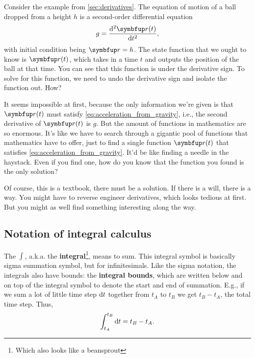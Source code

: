 Consider the example from \cref{sec:derivatives}. The equation of motion of a ball dropped from a height \(h\) is a second-order differential equation
\begin{equation}
  g = \odv[ord = 2]{\vv{r}(t)}{t}, \label{eq:acceleration_from_gravity}
\end{equation}
with initial condition being \(\vv{r} = h\). The state function that we ought to know is \(\vv{r}(t)\), which takes in a time \(t\) and outputs the position of the ball at that time. You can see that this function is under the derivative sign. To solve for this function, we need to undo the derivative sign and isolate the function out. How?

It seems impossible at first, because the only information we're given is that \(\vv{r}(t)\) must satisfy \cref{eq:acceleration_from_gravity}, i.e., the second derivative of \(\vv{r}(t)\) is \(g\). But the amount of functions in mathematics are so enormous. It's like we have to search through a gigantic pool of functions that mathematics have to offer, just to find a single function \(\vv{r}(t)\) that satisfies \cref{eq:acceleration_from_gravity}. It'd be like finding a needle in the haystack. Even if you find one, how do you know that the function you found is the only solution?

Of course, this is a textbook, there must be a solution. If there is a will, there is a way. You might have to reverse engineer derivatives, which looks tedious at first. But you might as well find something interesting along the way.

\subsection{Notation of integral calculus}
\label{sec:brief_notation_of_calculus_integral}

The \(\int\), a.k.a. the \textbf{integral}\footnote{Which also looks like a beansprout}, means to sum. This integral symbol is basically sigma summation symbol, but for infinitesimals. Like the sigma notation, the integrals also have bounds: the \textbf{integral bounds}, which are written below and on top of the integral symbol to denote the start and end of summation. E.g., if we sum a lot of little time step \(\odif{t}\) together from \(t_A\) to \(t_B\) we get \(t_B - t_A\), the total time step. Thus,
\begin{equation}
  \int_{t_A}^{t_B}\odif{t} = t_B - t_A.
\end{equation}

